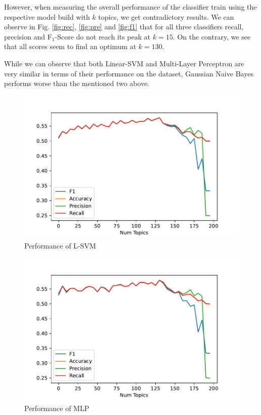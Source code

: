 \documentclass[sigconf, nonacm]{acmart}
\begin{document}
However, when measuring the overall performance of the classifier train using the respective model build with $k$ topics, we get contradictory results. We can observe in Fig. \ref{fig:rec}, \ref{fig:pre} and \ref{fig:f1} that for all three classifiers recall, precision and F$_1$-Score do not reach its peak at $k=15$. On the contrary, we see that all scores seem to find an optimum at $k=130$.

While we can observe that both Linear-SVM and Multi-Layer Perceptron are very similar in terms of their performance on the dataset, Gaussian Naive Bayes performs worse than the mentioned two above.

\begin{figure}
	\centering
	\includegraphics[width=\linewidth]{figures/summary_l-svm.pdf}
	\caption{Performance of L-SVM}
	\label{fig:sum-lsvm}
\end{figure}

\begin{figure}
	\centering
	\includegraphics[width=\linewidth]{figures/summary_mlp.pdf}
	\caption{Performance of MLP}
	\label{fig:sum-mlp}
\end{figure}
\end{document}
